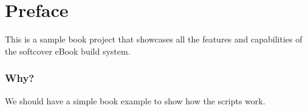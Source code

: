 

\chapter{Preface}
\label{sec:preface}

	This is a sample book project that showcases all the features and capabilities of the softcover eBook build system.

	\subsection{Why?}
	
		We should have a simple book example to show how the scripts work.